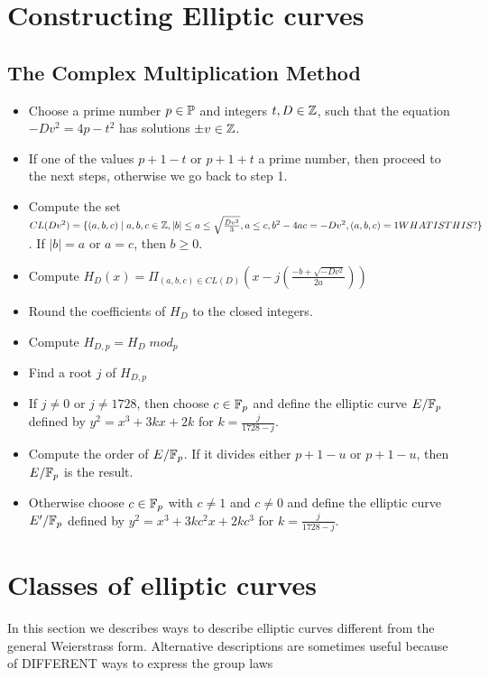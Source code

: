 \section{Constructing Elliptic curves}
\subsection{The Complex Multiplication Method}
\begin{itemize}
\item Choose a prime number $p\in\mathbb{P}$ and integers $t,D\in\mathbb{Z}$, such that the equation $-Dv^2 = 4p - t^2$ has solutions $\pm v \in \mathbb{Z}$.
\item If one of the values $p+1-t$ or $p+1+t$ a prime number, then proceed to the next steps, otherwise we go back to step 1.
\item Compute the set $CL(Dv^2)=\{(a,b,c)\;|\; a,b,c\in\mathbb{Z}, |b|\leq a \leq \sqrt{\frac{Dv^2}{3}},a\leq c, b^2-4ac=-Dv^2, (a,b,c)=1WHATISTHIS?\}$. If $|b|=a$ or $a=c$, then $b\geq 0$.
\item Compute $H_D(x)=\Pi_{(a,b,c)\in CL(D)} (x-j(\frac{-b+\sqrt{-Dv^2}}{2a}))$
\item Round the coefficients of $H_D$ to the closed integers.
\item Compute $H_{D,p} =H_D \; mod_p$
\item Find a root $j$ of $H_{D,p}$ 
\item If $j\neq 0$ or $j\neq 1728$, then choose $c\in \mathbb{F}_p$ and define the elliptic curve $E/\mathbb{F}_p$ defined by $y^2 = x^3 + 3kx+2k$ for $k= \frac{j}{1728-j}$.
\item Compute the order of $E/\mathbb{F}_p$. If it divides either $p+1-u$ or $p+1-u$, then $E/\mathbb{F}_p$ is the result.
\item Otherwise choose $c\in \mathbb{F}_p$ with $c\neq 1$ and $c\neq 0$ and define the elliptic curve $E'/\mathbb{F}_p$ defined by $y^2 = x^3 + 3kc^2x+2kc^3$ for $k= \frac{j}{1728-j}$.
\end{itemize}
\section{Classes of elliptic curves}
In this section we describes ways to describe elliptic curves different from the general Weierstrass form. Alternative descriptions are sometimes useful because of DIFFERENT ways to express the group laws

